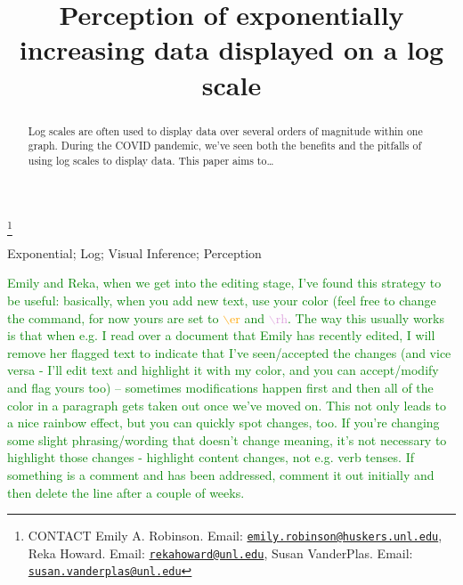 \documentclass[]{interact}
\theoremstyle{plain}%
\theoremstyle{definition}
\theoremstyle{remark}
\begin{document}

\title{Perception of exponentially increasing data displayed on a log scale}


\author{
}

\thanks{CONTACT Emily A. Robinson. Email: \href{mailto:emily.robinson@huskers.unl.edu}{\nolinkurl{emily.robinson@huskers.unl.edu}}, Reka Howard. Email: \href{mailto:rekahoward@unl.edu}{\nolinkurl{rekahoward@unl.edu}}, Susan VanderPlas. Email: \href{mailto:susan.vanderplas@unl.edu}{\nolinkurl{susan.vanderplas@unl.edu}}}

\maketitle

\begin{abstract}
Log scales are often used to display data over several orders of
magnitude within one graph. During the COVID pandemic, we've seen both
the benefits and the pitfalls of using log scales to display data. This
paper aims to\ldots{}
\end{abstract}

\begin{keywords}
Exponential; Log; Visual Inference; Perception
\end{keywords}

\textcolor{Green}{Emily and Reka, when we get into the editing stage, I've found this strategy to be useful: basically, when you add new text, use your color (feel free to change the command, for now yours are set to \textcolor{Orange}{$\backslash$er} and \textcolor{Plum}{$\backslash$rh}.}
\textcolor{Green}{The way this usually works is that when e.g. I read over a document that Emily has recently edited, I will remove her flagged text to indicate that I've seen/accepted the changes (and vice versa - I'll edit text and highlight it with my color, and you can accept/modify and flag yours too) -- sometimes modifications happen first and then all of the color in a paragraph gets taken out once we've moved on.}
\textcolor{Green}{This not only leads to a nice rainbow effect, but you can quickly spot changes, too. If you're changing some slight phrasing/wording that doesn't change meaning, it's not necessary to highlight those changes - highlight content changes, not e.g. verb tenses.}
\textcolor{Green}{If something is a comment and has been addressed, comment it out initially and then delete the line after a couple of weeks.}
\end{document}
